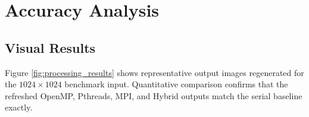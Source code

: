 \documentclass[12pt,a4paper]{report}
\begin{document}
    
    
    

\newpage

\chapter{Accuracy Analysis}

\section{Visual Results}

Figure \ref{fig:processing_results} shows representative output images regenerated for the
$1024 \times 1024$ benchmark input. Quantitative comparison confirms that the refreshed
OpenMP, Pthreads, MPI, and Hybrid outputs match the serial baseline exactly.
\end{document}
